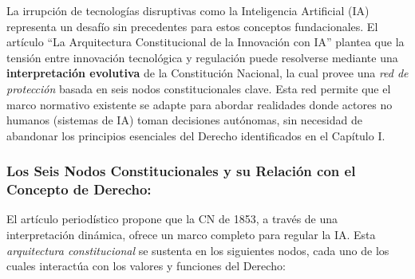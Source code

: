 \documentclass[10pt, a4paper]{article}
\begin{document}
La irrupción de tecnologías disruptivas como la Inteligencia Artificial (IA) representa un desafío sin precedentes para estos conceptos fundacionales. El artículo ``La Arquitectura Constitucional de la Innovación con IA'' plantea que la tensión entre innovación tecnológica y regulación puede resolverse mediante una \textbf{interpretación evolutiva} de la Constitución Nacional, la cual provee una \emph{red de protección} basada en seis nodos constitucionales clave. Esta red permite que el marco normativo existente se adapte para abordar realidades donde actores no humanos (sistemas de IA) toman decisiones autónomas, sin necesidad de abandonar los principios esenciales del Derecho identificados en el Capítulo I.

\subsubsection*{Los Seis Nodos Constitucionales y su Relación con el Concepto de Derecho:}
El artículo periodístico propone que la CN de 1853, a través de una interpretación dinámica, ofrece un marco completo para regular la IA. Esta \emph{arquitectura constitucional} se sustenta en los siguientes nodos, cada uno de los cuales interactúa con los valores y funciones del Derecho:
\end{document}
